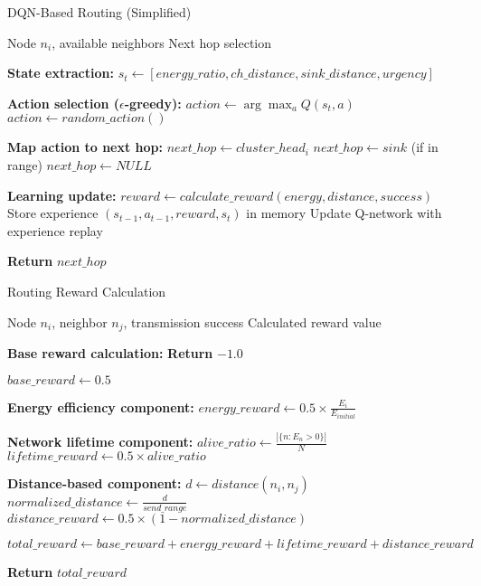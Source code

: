 \documentclass{article}
\begin{document}
\begin{algorithm}[H]
\caption{DQN-Based Routing (Simplified)}
\label{alg:dqn_simple}
\begin{algorithmic}[1]

\REQUIRE Node $n_i$, available neighbors
\ENSURE Next hop selection

\STATE \textbf{State extraction:}
\STATE $s_t \leftarrow [energy\_ratio, ch\_distance, sink\_distance, urgency]$

\STATE \textbf{Action selection ($\epsilon$-greedy):}
    \STATE $action \leftarrow \arg\max_a Q(s_t, a)$ 
\ELSE
    \STATE $action \leftarrow random\_action()$ 
\ENDIF

\STATE \textbf{Map action to next hop:}
 
    \STATE $next\_hop \leftarrow cluster\_head_i$
 
    \STATE $next\_hop \leftarrow sink$ (if in range)
\ELSE {}
    \STATE $next\_hop \leftarrow NULL$
\ENDIF

\STATE \textbf{Learning update:}
\STATE $reward \leftarrow calculate\_reward(energy, distance, success)$
\STATE Store experience $(s_{t-1}, a_{t-1}, reward, s_t)$ in memory
\STATE Update Q-network with experience replay

\STATE \textbf{Return} $next\_hop$

\end{algorithmic}
\end{algorithm}

\begin{algorithm}[H]
\caption{Routing Reward Calculation}
\label{alg:reward_calc}
\begin{algorithmic}[1]

\REQUIRE Node $n_i$, neighbor $n_j$, transmission success
\ENSURE Calculated reward value

\STATE \textbf{Base reward calculation:}
    \STATE \textbf{Return} $-1.0$
\ENDIF

\STATE $base\_reward \leftarrow 0.5$

\STATE \textbf{Energy efficiency component:}
\STATE $energy\_reward \leftarrow 0.5 \times \frac{E_i}{E_{initial}}$

\STATE \textbf{Network lifetime component:}
\STATE $alive\_ratio \leftarrow \frac{|\{n : E_n > 0\}|}{N}$
\STATE $lifetime\_reward \leftarrow 0.5 \times alive\_ratio$

\STATE \textbf{Distance-based component:}
\STATE $d \leftarrow distance(n_i, n_j)$
\STATE $normalized\_distance \leftarrow \frac{d}{send\_range}$
\STATE $distance\_reward \leftarrow 0.5 \times (1 - normalized\_distance)$

\STATE $total\_reward \leftarrow base\_reward + energy\_reward + lifetime\_reward + distance\_reward$

\STATE \textbf{Return} $total\_reward$

\end{algorithmic}
\end{algorithm}
\end{document}
